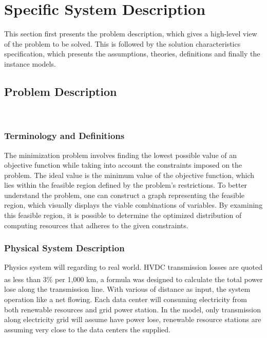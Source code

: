 \documentclass[12pt]{article}
\begin{document}
\section{Specific System Description}

This section first presents the problem description, which gives a high-level
view of the problem to be solved.  This is followed by the solution characteristics
specification, which presents the assumptions, theories, definitions and finally
the instance models.

\subsection{Problem Description} \label{Sec_pd}

 \\

\subsubsection{Terminology and  Definitions}\label{ssc:terminology-definitions}
\label{ssc:TM}

 {The minimization problem involves finding the lowest possible value of an objective function while taking into account the constraints imposed on the problem. The ideal value is the minimum value of the objective function, which lies within the feasible region defined by the problem's restrictions. To better understand the problem, one can construct a graph representing the feasible region, which visually displays the viable combinations of variables. By examining this feasible region, it is possible to determine the optimized distribution of computing resources that adheres to the given constraints. }




\subsubsection{Physical System Description} \label{sec_phySystDescrip}

{Physics system will regarding to real world. HVDC transmission losses are quoted as less than 3\% per 1,000 km\textsuperscript{\cite{rosellon2003different}}, a formula was designed to calculate the total power lose along the transmission line. With various of distance as input, the system operation like a net flowing. Each data center will consuming electricity from both renewable resources and grid power station. In the model, only transmission along electricity grid will assume have power lose, renewable resource stations are assuming very close to the data centers the supplied.  }
\end{document}
